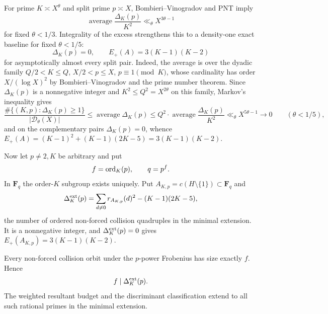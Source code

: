 For prime $K\asymp X^\theta$ and split prime $p\asymp X$,
Bombieri--Vinogradov and PNT \cite{Bombieri1965,IK2004} imply
\[
\operatorname{average}\frac{\Delta_K(p)}{K^2}
 \ll_\theta X^{3\theta-1}
\]
for fixed $\theta<1/3$.  Integrality of the excess strengthens this to a
density-one exact baseline for fixed $\theta<1/5$:
\[
\Delta_K(p)=0,
\qquad
E_+(A)=3(K-1)(K-2)
\]
for asymptotically almost every split pair.
Indeed, the average is over the dyadic family $Q/2<K\le Q$,
$X/2<p\le X$, $p\equiv1\pmod K$, whose cardinality has order
$X/(\log X)^2$ by Bombieri--Vinogradov and the prime number
theorem.  Since $\Delta_K(p)$ is a nonnegative integer and
$K^2\le Q^2=X^{2\theta}$ on this family, Markov's inequality gives
\[
\frac{\#\{(K,p):\Delta_K(p)\ge1\}}{|\mathcal D_\theta(X)|}
\le\operatorname{average}\Delta_K(p)
\le Q^2\cdot\operatorname{average}\frac{\Delta_K(p)}{K^2}
\ll_\theta X^{5\theta-1}\longrightarrow0
\qquad(\theta<1/5),
\]
and on the complementary pairs $\Delta_K(p)=0$, whence
$E_+(A)=(K-1)^2+(K-1)(2K-5)=3(K-1)(K-2)$.

Now let $p\ne2,K$ be arbitrary and put
\[
f=\operatorname{ord}_K(p),\qquad q=p^f.
\]
In $\mathbf F_q$ the order-$K$ subgroup exists uniquely.  Put
$A_{K,p}=c(H\setminus\{1\})\subset\mathbf F_q$ and
\[
\Delta_K^{\rm ext}(p)
 =\sum_{d\ne0}r_{A_{K,p}}(d)^2-(K-1)(2K-5),
\]
the number of ordered non-forced collision quadruples in the
minimal extension.  It is a nonnegative integer, and
$\Delta_K^{\rm ext}(p)=0$ gives $E_+(A_{K,p})=3(K-1)(K-2)$.

\begin{theorem}\label{thm:frob}
Every non-forced collision orbit under the $p$-power Frobenius has size exactly
$f$.  Hence
\[
f\mid\Delta_K^{\rm ext}(p).
\]
The weighted resultant budget and the discriminant classification extend to
all such rational primes in the minimal extension.
\end{theorem}

